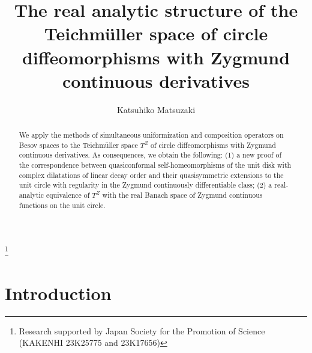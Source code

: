 \documentclass[amstex]{amsart}
\theoremstyle{definition}
\theoremstyle{remark}
\numberwithin{equation}{section}
\begin{document}
\title[The Teichm\"uller space of Zygmund diffeomorphisms]
{The real analytic structure of the Teichm\"uller space of 
circle diffeomorphisms with Zygmund continuous derivatives}

\author[K. Matsuzaki]{Katsuhiko Matsuzaki}
\address{Department of Mathematics, School of Education, Waseda University, 
Shinjuku, Tokyo 169-8050, Japan}
\thanks{Research supported by 
Japan Society for the Promotion of Science (KAKENHI 23K25775 and 23K17656)}

 

\begin{abstract}
We apply the methods of simultaneous uniformization and composition operators on
Besov spaces to the Teichm\"uller space $T^Z$ of 
circle diffeomorphisms with Zygmund continuous deriv\-atives.
As consequences, we obtain the following: (1) a new proof of the correspondence between quasiconformal self-homeomorphisms of
the unit disk with complex dilatations of linear decay order and their quasisymmetric extensions to the unit circle
with regularity 
in the Zygmund continuously differentiable class; (2) a real-analytic equivalence of $T^Z$ with
the real Banach space of Zygmund continuous functions on the unit circle.
\end{abstract}


\maketitle


\section{Introduction}
\end{document}
